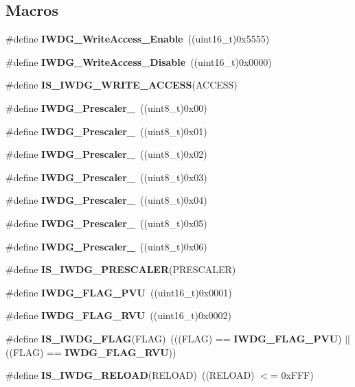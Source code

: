 \subsection*{Macros}
\begin{DoxyCompactItemize}
\item 
\#define \textbf{ I\+W\+D\+G\+\_\+\+Write\+Access\+\_\+\+Enable}~((uint16\+\_\+t)0x5555)
\item 
\#define \textbf{ I\+W\+D\+G\+\_\+\+Write\+Access\+\_\+\+Disable}~((uint16\+\_\+t)0x0000)
\item 
\#define \textbf{ I\+S\+\_\+\+I\+W\+D\+G\+\_\+\+W\+R\+I\+T\+E\+\_\+\+A\+C\+C\+E\+SS}(A\+C\+C\+E\+SS)
\item 
\#define \textbf{ I\+W\+D\+G\+\_\+\+Prescaler\+\_}~((uint8\+\_\+t)0x00)
\item 
\#define \textbf{ I\+W\+D\+G\+\_\+\+Prescaler\+\_}~((uint8\+\_\+t)0x01)
\item 
\#define \textbf{ I\+W\+D\+G\+\_\+\+Prescaler\+\_}~((uint8\+\_\+t)0x02)
\item 
\#define \textbf{ I\+W\+D\+G\+\_\+\+Prescaler\+\_}~((uint8\+\_\+t)0x03)
\item 
\#define \textbf{ I\+W\+D\+G\+\_\+\+Prescaler\+\_}~((uint8\+\_\+t)0x04)
\item 
\#define \textbf{ I\+W\+D\+G\+\_\+\+Prescaler\+\_}~((uint8\+\_\+t)0x05)
\item 
\#define \textbf{ I\+W\+D\+G\+\_\+\+Prescaler\+\_}~((uint8\+\_\+t)0x06)
\item 
\#define \textbf{ I\+S\+\_\+\+I\+W\+D\+G\+\_\+\+P\+R\+E\+S\+C\+A\+L\+ER}(P\+R\+E\+S\+C\+A\+L\+ER)
\item 
\#define \textbf{ I\+W\+D\+G\+\_\+\+F\+L\+A\+G\+\_\+\+P\+VU}~((uint16\+\_\+t)0x0001)
\item 
\#define \textbf{ I\+W\+D\+G\+\_\+\+F\+L\+A\+G\+\_\+\+R\+VU}~((uint16\+\_\+t)0x0002)
\item 
\#define \textbf{ I\+S\+\_\+\+I\+W\+D\+G\+\_\+\+F\+L\+AG}(F\+L\+AG)~(((F\+L\+AG) == \textbf{ I\+W\+D\+G\+\_\+\+F\+L\+A\+G\+\_\+\+P\+VU}) $\vert$$\vert$ ((F\+L\+AG) == \textbf{ I\+W\+D\+G\+\_\+\+F\+L\+A\+G\+\_\+\+R\+VU}))
\item 
\#define \textbf{ I\+S\+\_\+\+I\+W\+D\+G\+\_\+\+R\+E\+L\+O\+AD}(R\+E\+L\+O\+AD)~((R\+E\+L\+O\+AD) $<$= 0x\+F\+F\+F)
\end{DoxyCompactItemize}
